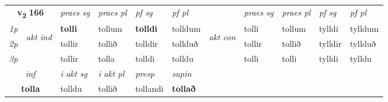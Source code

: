 \noindent
\begin{tabular}{lllllllllll} \toprule
\multicolumn{2}{c}{\textbf{v{\textsubscript{2}}} \Large{\textbf{166}}}  &  \textit{praes sg}  & \textit{praes pl}  &\textit{ pf sg} & \textit{pf pl} &  &  \textit{praes sg}  & \textit{praes pl}  & \textit{pf sg} & \textit{pf pl } \\*
	\cmidrule{3-6} \cmidrule{8-11}
 {\textit{1p}} & \multirow{3}{*}{\begin{turn}{90}\textit{akt ind}\end{turn}} & \textbf{tolli} & tollum & \textbf{tolldi} & tolldum & \multirow{3}{*}{\begin{turn}{90}\textit{akt con}\end{turn}} &tolli & tollum & tylldi & tylldum\\*
 {\textit{2p}} &  &  tollir  & tollið & tolldir & tollduð & & tollir & tollið & tylldir & tyllduð \\*
{\textit{3p}} &  & tollir & tolla & tolldi & tolldu & & tolli & tolli& tylldi & tylldu \\*
\cmidrule{3-6} \cmidrule{8-11}

   \multicolumn{2}{c}{\textit{inf}}  & \textit{i akt sg} & \textit{i akt pl}   & \textit{presp} & \textit{supin}   \\*
  \multicolumn{2}{c}{\textbf{tolla}} & tolldu  & tollið   & tollandi &  \textbf{tollað}   \\*
\end{tabular}

